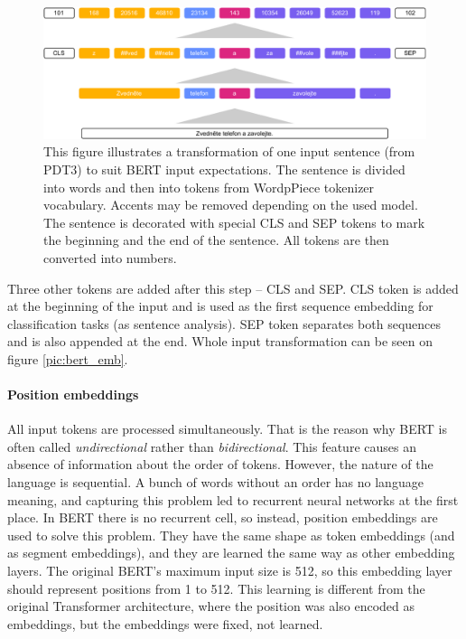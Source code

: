\begin{figure}[H]
\centering
\includegraphics[width=1\columnwidth]{../img/bert_input}
\protect\caption[Transformation of the BERT tokenizer]{This figure illustrates a transformation of one input sentence (from PDT3) to suit BERT input expectations. The sentence is divided into words and then into tokens from WordpPiece tokenizer vocabulary. Accents may be removed depending on the used model. The sentence is decorated with special CLS and SEP tokens to mark the beginning and the end of the sentence. All tokens are then converted into numbers. }
\label{pic:bert_inp}
\end{figure}
\par
Three other tokens are added after this step -- CLS and SEP. 
CLS token is added at the beginning of the input and is used as the first sequence embedding for classification tasks (as sentence analysis). SEP token separates both sequences and is also appended at the end. Whole input transformation can be seen on figure \ref{pic:bert_emb}.
\paragraph{Position embeddings}
All input tokens are processed simultaneously. That is the reason why BERT is often called \textit{undirectional} rather than \textit{bidirectional}. This feature causes an absence of information about the order of tokens. However, the nature of the language is sequential. A bunch of words without an order has no language meaning, and capturing this problem led to recurrent neural networks at the first place. In BERT there is no recurrent cell, so instead, position embeddings are used to solve this problem. They have the same shape as token embeddings (and as segment embeddings), and they are learned the same way as other embedding layers. The original BERT's maximum input size is 512, so this embedding layer should represent positions from 1 to 512. This learning is different from the original Transformer architecture, where the position was also encoded as embeddings, but the embeddings were fixed, not learned.
